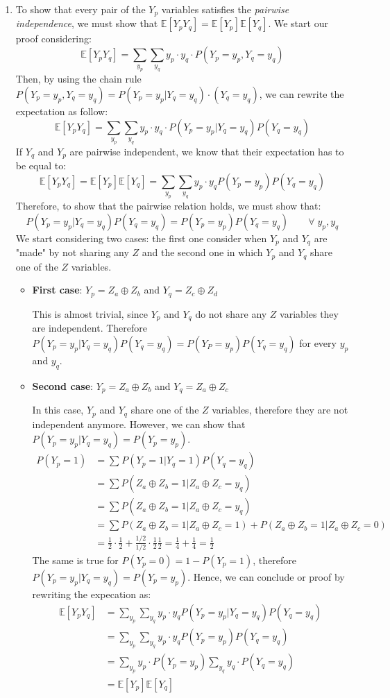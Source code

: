 \documentclass[11pt,a4paper]{article}
\begin{document}
\begin{enumerate}
\begin{enumerate}
\item 
To show that every pair of the $Y_p$ variables satisfies the \textit{pairwise independence}, we must
show that $\mathbb{E}[Y_pY_q]=\mathbb{E}[Y_p]\mathbb{E}[Y_q]$. We start our proof considering:
\[
\mathbb{E}[Y_pY_q] = \sum_{y_p}\sum_{y_q}y_p \cdot y_q \cdot P(Y_p=y_p, Y_q=y_q)
\]
Then, by using the chain rule $P(Y_p=y_p, Y_q=y_q)=P(Y_p=y_p|Y_q=y_q)\cdot(Y_q=y_q)$, we can rewrite the expectation as follow:
\[
\mathbb{E}[Y_pY_q] = \sum_{y_p}\sum_{y_q}y_p\cdot y_q \cdot P(Y_p=y_p|Y_q=y_q)P(Y_q=y_q)
\]
If $Y_q$ and $Y_p$ are pairwise independent, we know that their expectation has to be equal to:
\[
\mathbb{E}[Y_pY_q]=\mathbb{E}[Y_p]\mathbb{E}[Y_q]=\sum_{y_p}\sum_{y_q}y_p\cdot y_q P(Y_p=y_p)P(Y_q=y_q) 
\]
Therefore, to show that the pairwise relation holds, we must show that:
\[
P(Y_p=y_p|Y_q=y_q)P(Y_q=y_q) = P(Y_p=y_p)P(Y_q=y_q) \qquad \forall \; y_p, y_q
\]
We start considering two cases: the first one consider when $Y_p$ and $Y_q$ are
"made" by not sharing any $Z$ and the second one in which $Y_p$ and $Y_q$ share
one of the $Z$ variables.
\begin{itemize}
\item \textbf{First case}: $Y_p = Z_a \oplus Z_b$ and $Y_q = Z_c \oplus Z_d$
\smallskip

This is almost trivial, since $Y_p$ and $Y_q$ do not share any $Z$ variables
they are independent. Therefore $P(Y_p = y_p | Y_q=y_q)P(Y_q=y_q)=P(Y_P=y_p)P(Y_q=y_q)$
for every $y_p$ and $y_q$.

\item \textbf{Second case}: $Y_p = Z_a \oplus Z_b $ and $ Y_q = Z_a \oplus Z_c$
\smallskip

In this case, $Y_p$ and $Y_q$ share one of the $Z$ variables, therefore they are not
independent anymore. However, we can show that $P(Y_p=y_p | Y_q=y_q) = P(Y_p=y_p)$.
\begin{align*}
P(Y_p=1) &= \sum_{}P(Y_p=1 | Y_q=1)P(Y_q=y_q) \\
&= \sum{}P(Z_a \oplus Z_b = 1 | Z_a \oplus Z_c = y_q) \\
&= \sum{}P(Z_a \oplus Z_b = 1 | Z_a \oplus Z_c = y_q) \\
&= \sum{}P(Z_a \oplus Z_b = 1 |  Z_a \oplus Z_c = 1) + P(Z_a \oplus Z_b = 1 |  Z_a \oplus Z_c = 0)\\
&= \frac{1}{2}\cdot\frac{1}{2} + \frac{1/2}{1/2}\cdot\frac{1}{2}\frac{1}{2} = \frac{1}{4}+\frac{1}{4} = \frac{1}{2}
\end{align*}
The same is true for $P(Y_p=0)=1-P(Y_p=1)$, therefore $P(Y_p=y_p | Y_q=y_q) = P(Y_p=y_p)$. Hence, we can
conclude or proof by rewriting the expecation as:
\begin{align*}
\mathbb{E}[Y_pY_q]&=\sum_{y_p}\sum_{y_q}y_p\cdot y_q P(Y_p=y_p|Y_q=y_q)P(Y_q=y_q)\\
&= \sum_{y_p}\sum_{y_q}y_p\cdot y_q P(Y_p=y_p)P(Y_q=y_q)\\
&= \sum_{y_p}y_p\cdot P(Y_p=y_p)\sum_{y_q} y_q\cdot P(Y_q=y_q)\\
&= \mathbb{E}[Y_p]\mathbb{E}[Y_q]
\end{align*}


\end{itemize}
\end{enumerate}
\end{enumerate}
\end{document}
